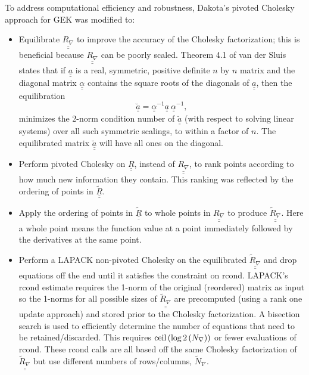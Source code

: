 To address computational efficiency and robustness, Dakota's pivoted
Cholesky approach for GEK was modified to: 
\begin{itemize}
\item Equilibrate $\underline{\underline{R_{\nabla}}}$ to improve 
      the accuracy of the Cholesky factorization; this is beneficial
      because $\underline{\underline{R_{\nabla}}}$ can be poorly 
      scaled. Theorem 4.1 of 
      van der Sluis \cite{Van69} states that if
      $\underline{\underline{a}}$ is a real, symmetric, positive 
      definite $n$ by $n$ matrix and the diagonal matrix 
      $\underline{\underline{\alpha}}$ contains the square roots of the 
      diagonals of $\underline{\underline{a}}$, then the equilibration
      \begin{displaymath}
        \underline{\underline{\breve{a}}}=\underline{\underline{\alpha}}^{-1}\underline{\underline{a}}\ \underline{\underline{\alpha}}^{-1},
      \end{displaymath}
      minimizes the 2-norm condition number of 
      $\underline{\underline{\breve{a}}}$ (with respect to solving linear 
      systems) over all such symmetric scalings, to within a factor of $n$.
      The equilibrated matrix $\underline{\underline{\breve{a}}}$ will 
      have all ones on the diagonal.
\item Perform pivoted Cholesky on $\underline{\underline{R}}$,
      instead of $\underline{\underline{R_{\nabla}}}$, to rank points 
      according to how much new information they contain.  This 
      ranking was reflected by the ordering of points in 
      $\underline{\underline{\tilde{R}}}$.
\item Apply the ordering of points in $\underline{\underline{\tilde{R}}}$
      to whole points in $\underline{\underline{R_{\nabla}}}$ to produce
      $\underline{\underline{\tilde{R}_{\nabla}}}$.  Here a whole point
      means the function value at a point immediately followed by the 
      derivatives at the same point.
\item Perform a LAPACK non-pivoted Cholesky on the equilibrated   
      $\underline{\underline{\tilde{R}_{\nabla}}}$ and drop equations off 
      the end until it satisfies the constraint on rcond.  LAPACK's rcond 
      estimate requires the 1-norm of the original (reordered) matrix as 
      input so the 1-norms for all possible sizes of 
      $\underline{\underline{\tilde{R}_{\nabla}}}$ are precomputed (using 
      a rank one update approach) and stored prior to the Cholesky 
      factorization.  A bisection search is used to efficiently determine 
      the number of equations that need to be retained/discarded. This
      requires ${\rm ceil}\left(\log2\left(N_{\nabla}\right)\right)$ or
      fewer evaluations of rcond.  These rcond calls are all based off the same
      Cholesky factorization of $\underline{\underline{\tilde{R}_{\nabla}}}$
      but use different numbers of rows/columns, $\tilde{N}_{\nabla}$.
\end{itemize}
